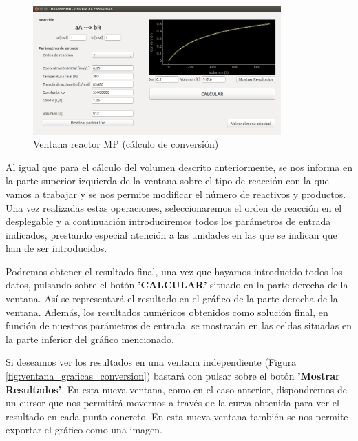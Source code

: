 \begin{figure}[h!]
	\begin{center}
		\includegraphics[width=0.85\textwidth]{./imagenes/reactor_fp/mezcla_perfecta3.png}\caption{Ventana reactor MP (cálculo de conversión)}\label{fig:ventana_conversion}
	\end{center}
\end{figure}

Al igual que para el cálculo del volumen descrito anteriormente, se nos informa en la parte superior izquierda de la ventana sobre el tipo de reacción con la que vamos a trabajar y se nos permite modificar el número de reactivos y productos. Una vez realizadas estas operaciones, seleccionaremos el orden de reacción en el desplegable y a continuación introduciremos todos los parámetros de entrada indicados, prestando especial atención a las unidades en las que se indican que han de ser introducidos.

Podremos obtener el resultado final, una vez que hayamos introducido todos los datos, pulsando sobre el botón \textbf{'CALCULAR'} situado en la parte derecha de la ventana. Así se representará el resultado en el gráfico de la parte derecha de la ventana. Además, los resultados numéricos obtenidos como solución final, en función de nuestros parámetros de entrada, se mostrarán en las celdas situadas en la parte inferior del gráfico mencionado.

Si deseamos ver los resultados en una ventana independiente (Figura \ref{fig:ventana_graficas_conversion}) bastará con pulsar sobre el botón \textbf{'Mostrar Resultados'}. En esta nueva ventana, como en el caso anterior, dispondremos de un cursor que nos permitirá movernos a través de la curva obtenida para ver el resultado en cada punto concreto. En esta nueva ventana también se nos permite exportar el gráfico como una imagen.

